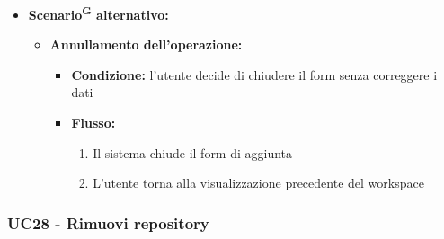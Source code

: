 \documentclass[a4paper, 11pt]{article}
\begin{document}
\begin{itemize}
\begin{enumerate}
		\item Il sistema rileva un errore durante la validazione o la connessione
		\item Il sistema annulla l'operazione di aggiunta
		\item Il sistema mostra un messaggio di errore specifico, a seconda della causa:
		\begin{itemize}
			\item \textbf{Link repository non valido}: verifica il formato dell'URL
			\item \textbf{Repository non trovata}: verifica che l'URL sia corretto, che la repository esista
			\item \textbf{Token non valido}: verifica il PAT
			\item \textbf{Permessi insufficienti}: il PAT non ha accesso alla repository
			\item \textbf{Repository già presente}: repository già presente nel workspace
			\item \textbf{Errore di connessione}: errore di connessione con GitHub\textsuperscript{G}, riprova più tardi
			\item \textbf{Branch\textsuperscript{G} non trovato}: il branch\textsuperscript{G} develop non esiste nella repository
		\end{itemize}
		\item Il sistema mantiene aperto il form di aggiunta per permettere correzioni o annullamento
	\end{enumerate}
	\item \textbf{Scenario\textsuperscript{G} alternativo:}
	\begin{itemize}
		\item \textbf{Annullamento dell'operazione:}
			\begin{itemize}
				\item \textbf{Condizione:} l'utente decide di chiudere il form senza correggere i dati
				\item \textbf{Flusso:}
				\begin{enumerate}
					\item Il sistema chiude il form di aggiunta
					\item L'utente torna alla visualizzazione precedente del workspace
				\end{enumerate}
			\end{itemize}
	\end{itemize}
\end{itemize}

\subsubsection{UC28 - Rimuovi repository} \label{UC28}
\end{document}
